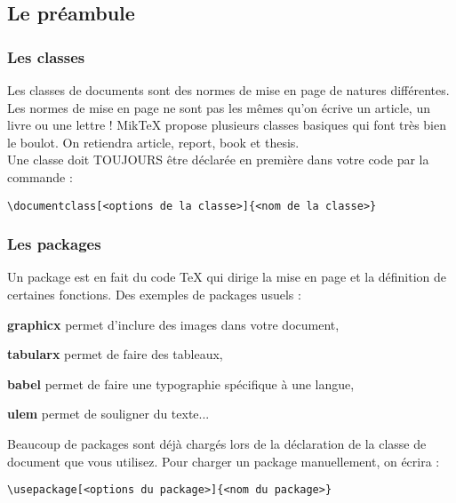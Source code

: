 \documentclass{beamer}
\begin{document}
\subsection[Préamb]{Le préambule}
\begin{frame}[fragile]
	\frametitle{Les classes}
	Les classes de documents sont des normes de mise en page de natures différentes. Les normes de mise en page ne sont pas les mêmes qu'on écrive un article, un livre ou une lettre ! MikTeX propose plusieurs classes basiques qui font très bien le boulot. On retiendra article, report, book et thesis.\\
	
	Une classe doit \alert{TOUJOURS} être déclarée en première dans votre code par la commande :
\begin{footnotesize}
	\begin{Verbatim}
\documentclass[<options de la classe>]{<nom de la classe>}
	\end{Verbatim}
\end{footnotesize}
\end{frame}


\begin{frame}[fragile]
	\frametitle{Les packages}
	Un package est en fait du code TeX qui dirige la mise en page et la définition de certaines fonctions. Des exemples de packages usuels :
	\begin{description}
		\item{\textbf{graphicx}} permet d'inclure des images dans votre document,
		\item{\textbf{tabularx}} permet de faire des tableaux,
		\item{\textbf{babel}} permet de faire une typographie spécifique à une langue,
		\item{\textbf{ulem}} permet de souligner du texte...
	\end{description}
	Beaucoup de packages sont déjà chargés lors de la déclaration de la classe de document que vous utilisez. Pour charger un package manuellement, on écrira :
	\begin{small}
	\begin{Verbatim}
\usepackage[<options du package>]{<nom du package>}
	\end{Verbatim}
	\end{small}
\end{frame}
\end{document}
